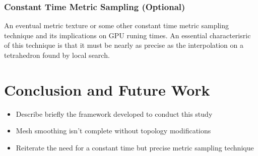 \documentclass[preprint,12pt]{elsarticle}
\begin{document}
\subsubsection{Constant Time Metric Sampling (Optional)}
\label{}
An eventual metric texture or some other constant time metric sampling technique and its implications on GPU runing times. An essential characterisric of this technique is that it must be nearly as precise as the interpolation on a tetrahedron found by local search.


\section{Conclusion and Future Work}
\label{}
\begin{itemize}
\item Describe briefly the framework developed to conduct this study
\item Mesh smoothing isn't complete without topology modifications
\item Reiterate the need for a constant time but precise metric sampling technique
\end{itemize}






\begin{thebibliography}{00}


\bibitem{}

\end{thebibliography}
\end{document}
